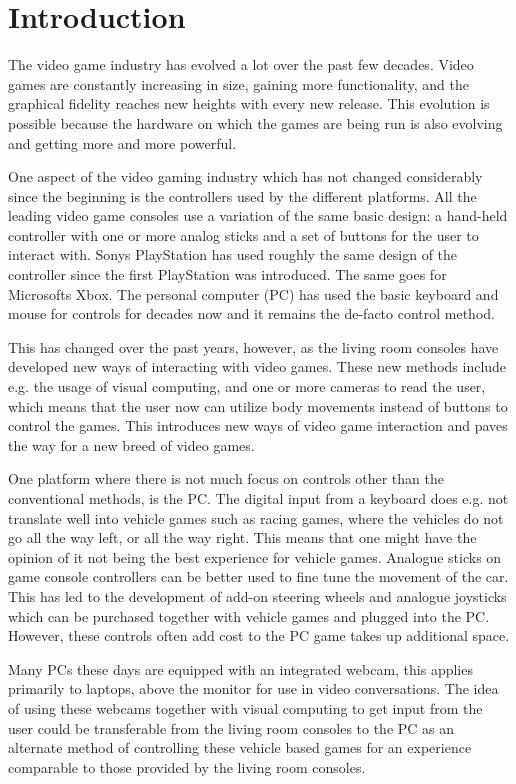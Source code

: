 \section{Introduction}
The video game industry has evolved a lot over the past few decades. Video games are constantly increasing in size, gaining more functionality, and the graphical fidelity reaches new heights with every new release. This evolution is possible because the hardware on which the games are being run is also evolving and getting more and more powerful.
\bigskip

One aspect of the video gaming industry which has not changed considerably since the beginning is the controllers used by the different platforms. All the leading video game consoles use a variation of the same basic design: a hand-held controller with one or more analog sticks and a set of buttons for the user to interact with. Sonys PlayStation has used roughly the same design of the controller since the first PlayStation was introduced. The same goes for Microsofts Xbox. The personal computer (PC) has used the basic keyboard and mouse for controls for decades now and it remains the de-facto control method.
\bigskip

This has changed over the past years, however, as the living room consoles have developed new ways of interacting with video games. These new methods include e.g. the usage of visual computing, and one or more cameras to read the user, which means that the user now can utilize body movements instead of buttons to control the games. This introduces new ways of video game interaction and paves the way for a new breed of video games.
\bigskip

One platform where there is not much focus on controls other than the conventional methods, is the PC. The digital input from a keyboard does e.g. not translate well into vehicle games such as racing games, where the vehicles do not go all the way left, or all the way right. This means that one might have the opinion of it not being the best experience for vehicle games. Analogue sticks on game console controllers can be better used to fine tune the movement of the car. This has led to the development of add-on steering wheels and analogue joysticks which can be purchased together with vehicle games and plugged into the PC. However, these controls often add cost to the PC game takes up additional space.
\bigskip

Many PCs these days are equipped with an integrated webcam, this applies primarily to laptops, above the monitor for use in video conversations. The idea of using these webcams together with visual computing to get input from the user could be transferable from the living room consoles to the PC as an alternate method of controlling these vehicle based games for an experience comparable to those provided by the living room consoles.

